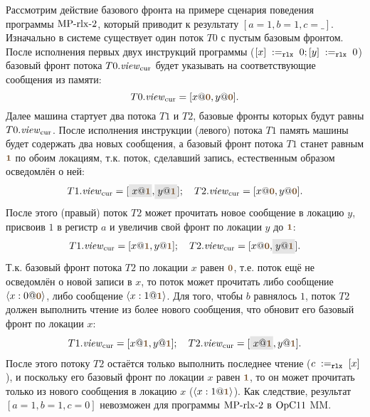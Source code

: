 Рассмотрим действие базового фронта на примере
сценария поведения
программы ${\rm MP\text{-}rlx\text{-}2}$,
который приводит к результату $[a = 1, b = 1, c = \_]$.
Изначально в системе существует один поток $T0$ с пустым базовым фронтом.
После исполнения первых двух инструкций программы
($[x] \;:=_{\mathtt{rlx}}\;0; [y] \;:=_{\mathtt{rlx}}\;0$) базовый фронт потока $T0.\mathit{view}_{\mathrm{cur}}$ будет указывать на
соответствующие сообщения из памяти:
\[
T0.\Rcur = [x@\tstamp{0}, y@\tstamp{0}].
\]
Далее машина стартует два потока $T1$ и $T2$, базовые фронты которых будут равны $T0.\mathit{view}_{\mathrm{cur}}$.
После исполнения инструкции (левого) потока $T1$ память машины будет
содержать два новых сообщения,
а базовый фронт потока $T1$ станет равным $\tstamp{1}$ по обоим локациям,
т.к. поток, сделавший запись, естественным образом осведомлён о ней:
\[
\begin{array}{l}
T1.\Rcur = [\graybox{x@\tstamp{1}}, \graybox{y@\tstamp{1}}];
\quad T2.\Rcur = [x@\tstamp{0}, y@\tstamp{0}].
\end{array}
\]
После этого (правый) поток $T2$ может прочитать новое сообщение в локацию $y$,
присвоив $1$ в регистр $a$
и увеличив свой фронт по локации $y$ до $\tstamp{1}$:
\[
\begin{array}{l}
T1.\Rcur = [x@\tstamp{1}, y@\tstamp{1}];
\quad T2.\Rcur = [x@\tstamp{0}, \graybox{y@\tstamp{1}}].
\end{array}
\]
Т.к. базовый фронт потока $T2$ по локации $x$ равен $\tstamp{0}$, т.е. поток ещё не осведомлён о новой записи в $x$, то
поток может прочитать либо сообщение $\angled{x:0@\tstamp{0}}$, либо сообщение $\angled{x:1@\tstamp{1}}$.
Для того, чтобы $b$ равнялось $1$, поток $T2$ должен выполнить чтение из более нового сообщения, что обновит его
базовый фронт по локации $x$:
\[
\begin{array}{l}
T1.\Rcur = [x@\tstamp{1}, y@\tstamp{1}];
\quad T2.\Rcur = [\graybox{x@\tstamp{1}}, y@\tstamp{1}].
\end{array}
\]
После этого потоку $T2$ остаётся только выполнить последнее чтение ($c \;:=_{\mathtt{rlx}}\;[x]$),
и поскольку его базовый фронт по локации $x$ равен $\tstamp{1}$, то он может прочитать только
из нового сообщения в локацию $x$ ($\angled{x:1@\tstamp{1}}$).
Как следствие, результат $[a = 1, b = 1, c = 0]$ невозможен для
программы ${\rm MP\text{-}rlx\text{-}2}$ в $\mathrm{OpC11}$ MM.


